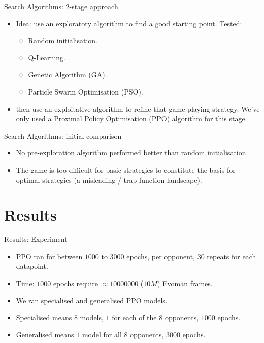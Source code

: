 \documentclass[boxes]{beamer}
\begin{document}
\begin{frame}{Search Algorithms: $2$-stage approach}
  \begin{itemize}
  \item Idea: use an exploratory algorithm to find a good starting point. \pause Tested:
    \begin{itemize}
    \item Random initialisation.
    \item Q-Learning.
    \item Genetic Algorithm (GA).
    \item Particle Swarm Optimisation (PSO).
    \end{itemize}
    \pause
  \item then use an exploitative algorithm to refine that game-playing strategy. We've only used a Proximal Policy Optimisation (PPO) algorithm for this stage.
  \end{itemize}
\end{frame}

\begin{frame}{Search Algorithms: initial comparison}
  \begin{itemize}
  \item No pre-exploration algorithm performed better than random initialisation.
  \item The game is too difficult for basic strategies to constitute the basis for optimal strategies (a misleading / trap function landscape).
  \end{itemize}
\end{frame}

\section{Results}
\begin{frame}{Results: Experiment}
  \begin{itemize}
  \item PPO ran for between $1000$ to $3000$ epochs, per opponent, $30$ repeats for each datapoint.
  \item Time: $1000$ epochs require $\approx 10000000$ ($10M$) Evoman frames.
  \item We ran specialised and generalised PPO models.
  \item Specialised means $8$ models, $1$ for each of the $8$ opponents, $1000$ epochs.
  \item Generalised means $1$ model for all $8$ opponents, $3000$ epochs.
  \end{itemize}
\end{frame}
\end{document}
